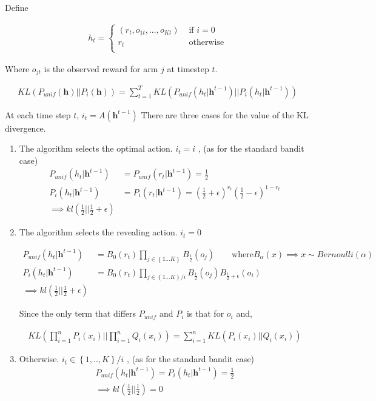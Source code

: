 \documentclass{article}
\newcommand{\set}[1]{\left\{#1\right\}}
\newcommand{\eqn}[1]{\begin{align}#1\end{align}}
\renewcommand{\Pi}[1]{P_i\left( #1 \right)}
\newcommand{\Pu}[1]{P_{unif}\left( #1 \right)}
\newcommand{\kl}[2]{KL\left(#1 || #2 \right)}
\theoremstyle{plain}
\theoremstyle{definition}
\begin{document}
Define 

\eqn{
h_t = 
\begin{cases}
(r_t,o_{1t},...,o_{Kt}) & \text{ if } i = 0 \\
r_t & \text{ otherwise}\\
\end{cases}
}

Where $o_{jt}$ is the observed reward for arm $j$ at timestep $t$.

\eqn {
\kl{\Pu{\boldsymbol{h}} }{\Pi{\boldsymbol{h}}} = 
\sum_{t=1}^T \kl{\Pu{h_t|\boldsymbol h^{t-1}}}{\Pi{h_t|\boldsymbol h^{t-1}}}
}

At each time step $t$, $i_t = A(\boldsymbol h^{t-1})$ There are three cases for the value of the KL divergence. 

\begin{enumerate}
\item The algorithm selects the optimal action. $i_t = i$ , (as for the standard bandit case)
\eqn{
\Pu{h_t|\boldsymbol h^{t-1}} &= \Pu{r_t|\boldsymbol h^{t-1}} = \frac{1}{2} \\
\Pi{h_t|\boldsymbol h^{t-1}} &= \Pi{r_t|\boldsymbol h^{t-1}} = 
(\frac{1}{2}+\epsilon)^{r_t}(\frac{1}{2}-\epsilon)^{1-r_t} \\
\implies kl(\frac{1}{2} || \frac{1}{2} + \epsilon)
}

\item The algorithm selects the revealing action. $i_t = 0$

\eqn {
\Pu{h_t|\boldsymbol h^{t-1}} &= B_0(r_t)\prod_{j \in \set{1...K}} B_{\frac{1}{2}}(o_j) \qquad \text{where} B_\alpha(x) \implies x \sim Bernoulli(\alpha) \\
\Pi{h_t|\boldsymbol h^{t-1}} &= B_0(r_t) \prod_{j \in \set{1...K}/i} B_{\frac{1}{2}}(o_j)B_{\frac{1}{2}+\epsilon}(o_i) \\
\implies kl(\frac{1}{2} || \frac{1}{2} + \epsilon)
}

Since the only term that differs $P_{unif}$ and $P_i$ is that for $o_i$ and,

\eqn{
\kl{\prod_{i=1}^nP_i(x_i)}{\prod_{i=1}^n Q_i(x_i)} = \sum_{i=1}^n \kl{P_i(x_i)}{Q_i(x_i)}
}


\item Otherwise. $i_t \in \set{1,..,K}/i$ , (as for the standard bandit case)
\eqn {
\Pu{h_t|\boldsymbol h^{t-1}} = \Pi{h_t|\boldsymbol h^{t-1}} = \frac{1}{2}\\
\implies kl(\frac{1}{2} ||\frac{1}{2}) = 0
}
\end{enumerate}
\end{document}
